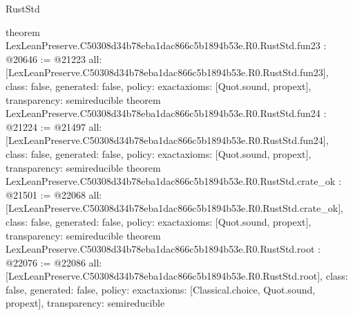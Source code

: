 \begin{lexlean}{RustStd}
\begin{coremodule}
{}
theorem LexLeanPreserve.C50308d34b78eba1dac866c5b1894b53e.R0.RustStd.fun23 : @20646 := @21223 {
  all: [LexLeanPreserve.C50308d34b78eba1dac866c5b1894b53e.R0.RustStd.fun23],
  class: false,
  generated: false,
  policy: exact{axioms: [Quot.sound, propext]},
  transparency: semireducible
}
theorem LexLeanPreserve.C50308d34b78eba1dac866c5b1894b53e.R0.RustStd.fun24 : @21224 := @21497 {
  all: [LexLeanPreserve.C50308d34b78eba1dac866c5b1894b53e.R0.RustStd.fun24],
  class: false,
  generated: false,
  policy: exact{axioms: [Quot.sound, propext]},
  transparency: semireducible
}
theorem LexLeanPreserve.C50308d34b78eba1dac866c5b1894b53e.R0.RustStd.crate_ok : @21501 := @22068 {
  all: [LexLeanPreserve.C50308d34b78eba1dac866c5b1894b53e.R0.RustStd.crate_ok],
  class: false,
  generated: false,
  policy: exact{axioms: [Quot.sound, propext]},
  transparency: semireducible
}
theorem LexLeanPreserve.C50308d34b78eba1dac866c5b1894b53e.R0.RustStd.root : @22076 := @22086 {
  all: [LexLeanPreserve.C50308d34b78eba1dac866c5b1894b53e.R0.RustStd.root],
  class: false,
  generated: false,
  policy: exact{axioms: [Classical.choice, Quot.sound, propext]},
  transparency: semireducible
}


\end{coremodule}
\end{lexlean}
